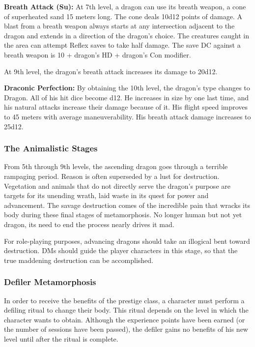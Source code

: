 {\textbf{Breath Attack (Su):} At 7th level, a dragon can use its breath weapon, a cone of superheated sand 15 meters long. The cone deals 10d12 points of damage. A blast from a breath weapon always starts at any intersection adjacent to the dragon and extends in a direction of the dragon's choice. The creatures caught in the area can attempt Reflex saves to take half damage. The save DC against a breath weapon is 10 + dragon's HD + dragon's Con modifier.

At 9th level, the dragon's breath attack increases its damage to 20d12.

\textbf{Draconic Perfection:} By obtaining the 10th level, the dragon's type changes to Dragon. All of his hit dice become d12. He increases in size by one last time, and his natural attacks increase their damage because of it. His flight speed improves to 45 meters with average maneuverability. His breath attack damage increases to 25d12.

\subsubsection{The Animalistic Stages}
From 5th through 9th levels, the ascending dragon goes through a terrible rampaging period. Reason is often superseded by a lust for destruction. Vegetation and animals that do not directly serve the dragon's purpose are targets for its unending wrath, laid waste in its quest for power and advancement. The savage destruction comes of the incredible pain that wracks its body during these final stages of metamorphosis. No longer human but not yet dragon, its need to end the process nearly drives it mad.

For role-playing purposes, advancing dragons should take an illogical bent toward destruction. DMs should guide the player characters in this stage, so that the true maddening destruction can be accomplished.

\subsubsection{Defiler Metamorphosis}
\label{Defiler Metamorphosis}

In order to receive the benefits of the prestige class, a character must perform a defiling ritual to change their body. This ritual depends on the level in which the character wants to obtain. Although the experience points have been earned (or the number of sessions have been passed), the defiler gains no benefits of his new level until after the ritual is complete.

}
